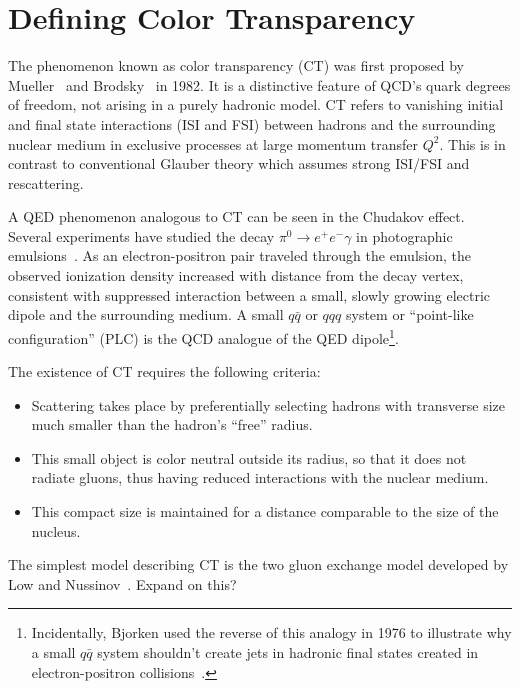 \section{Defining Color Transparency}
The phenomenon known as color transparency (CT) was first proposed by
Mueller~\cite{Mueller_1982} and Brodsky~\cite{Brodsky_1982} in 1982.
It is a distinctive feature of QCD's quark degrees of freedom, not arising in a
purely hadronic model.
CT refers to vanishing initial and final state interactions (ISI and FSI)
between hadrons and the surrounding nuclear medium in exclusive processes
at large momentum transfer $Q^2$.
This is in contrast to conventional Glauber theory which assumes strong ISI/FSI
and rescattering.


A QED phenomenon analogous to CT can be seen in the Chudakov effect.
Several experiments have studied the decay $\pi^0 \rightarrow e^+ e^- \gamma$
in photographic emulsions~\cite{Perkins_1955, Fowler_1955, Wolter_1956,
Iwadare_1958, Varfolomeev_1959, Zielinski_1985}.
As an electron-positron pair traveled through the emulsion,
the observed ionization density increased with distance from the decay vertex,
consistent with suppressed interaction between a
small, slowly growing electric dipole and the surrounding medium.
A small $q\bar{q}$ or $qqq$ system or ``point-like configuration'' (PLC) is the
QCD analogue of the QED dipole\footnote{Incidentally, Bjorken used
the reverse of this analogy in 1976 to illustrate why a small
$q\bar{q}$ system shouldn't create jets in hadronic final
states created in electron-positron collisions~\cite{Bjorken_1976}.}.


The existence of CT requires the following criteria:
\begin{itemize}
    \item Scattering takes place by preferentially selecting hadrons with
          transverse size much smaller than the hadron's ``free'' radius.
    \item This small object is color neutral outside its radius, so that it
          does not radiate gluons, thus having reduced interactions with the
          nuclear medium.
    \item This compact size is maintained for a distance comparable to the size
          of the nucleus.
\end{itemize}


The simplest model describing CT is the two gluon exchange model developed by
Low and Nussinov~\cite{Low_1975, Nussinov_1975, Nussinov_1976}.
Expand on this?


